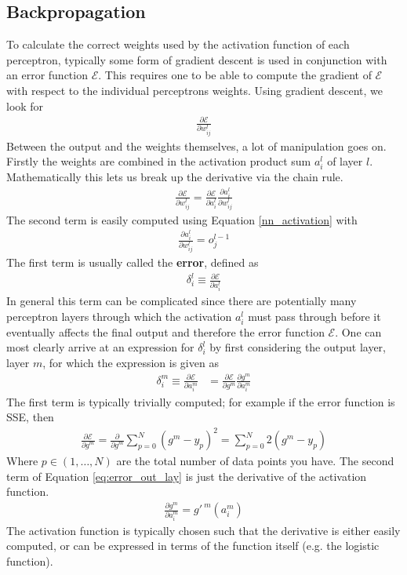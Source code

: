 \subsection{Backpropagation}\label{sec:backprop}
To calculate the correct weights used by the activation function of each perceptron, typically some form of gradient descent is used in conjunction with an error function $\mathcal{E}$. This requires one to be able to compute the gradient of $\mathcal{E}$ with respect to the individual perceptrons weights. Using gradient descent, we look for
\begin{align}
\frac{\partial \mathcal{E}}{\partial w_{ij}^l}
\end{align}
Between the output and the weights themselves, a lot of manipulation goes on. Firstly the weights are combined in the activation product sum $a_i^l$ of layer $l$. Mathematically this lets us break up the derivative via the chain rule. 
\begin{align}\label{eq:nn_weight_chain_rule}
    \frac{\partial \mathcal{E}}{\partial w_{ij}^l} = \frac{\partial \mathcal{E}}{\partial a_i^l}\frac{\partial a_i^l}{\partial w_{ij}^l}
\end{align}
The second term is easily computed using Equation \ref{nn_activation} with
\begin{align}
	\frac{\partial a_{i}^l}{\partial w_{ij}^l} = o_j^{l-1}
\end{align}
The first term is usually called the \textbf{error}, defined as 
\begin{align}
	\delta_{i}^l \equiv \frac{\partial \mathcal{E}}{\partial a_{i}^l}
\end{align}
In general this term can be complicated since there are potentially many perceptron layers through which the activation $a_i^l$ must pass through before it eventually affects the final output and therefore the error function $\mathcal{E}$. One can most clearly arrive at an expression for $\delta^l_i$ by first considering the output layer, layer $m$, for which the expression is given as
\begin{align}\label{eq:error_out_lay}
	\delta_{i}^m \equiv \frac{\partial \mathcal{E}}{\partial a_{i}^m} &=  \frac{\partial \mathcal{E}}{\partial g^m} \frac{\partial g^m}{\partial a_{i}^m}
\end{align}
The first term is typically trivially computed; for example if the error function is SSE, then
\begin{align}\label{eq:error_out_lay_1}
    \frac{\partial \mathcal{E}}{\partial g^m} = \frac{\partial }{\partial g^m}\sum_{p=0}^N (g^m - y_p)^2 = \sum_{p=0}^N 2(g^m - y_p)
\end{align}
Where $p\in(1,\ldots,N)$ are the total number of data points you have. The second term of Equation \ref{eq:error_out_lay} is just the derivative of the activation function.
\begin{align}\label{eq:error_out_lay_2}
    \frac{\partial g^m}{\partial a_{i}^m} = g'^{~m}(a_{i}^m)
\end{align}
The activation function is typically chosen such that the derivative is either easily computed, or can be expressed in terms of the function itself (e.g. the logistic function). 

